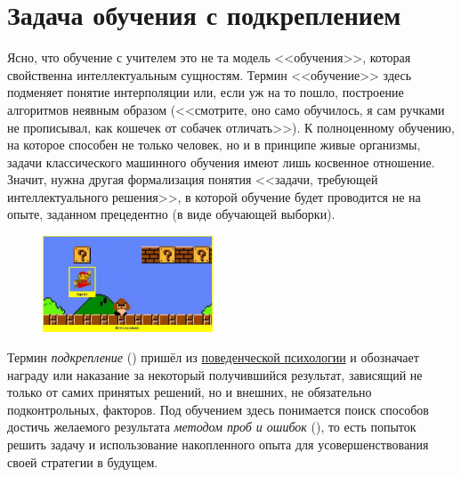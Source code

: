 \chapter{Задача обучения с подкреплением}

Ясно, что обучение с учителем это не та модель <<обучения>>, которая свойственна интеллектуальным сущностям. Термин <<обучение>> здесь подменяет понятие интерполяции или, если уж на то пошло, построение алгоритмов неявным образом (<<смотрите, оно само обучилось, я сам ручками не прописывал, как кошечек от собачек отличать>>). К полноценному обучению, на которое способен не только человек, но и в принципе живые организмы, задачи классического машинного обучения имеют лишь косвенное отношение. Значит, нужна другая формализация понятия <<задачи, требующей интеллектуального решения>>, в которой обучение будет проводится не на опыте, заданном прецедентно (в виде обучающей выборки).

\begin{figure}
\centering
\includegraphics[width=0.45\textwidth]{Images/agentenv.jpeg}
\end{figure}

Термин \emph{подкрепление} () пришёл из \href{https://ru.wikipedia.org/wiki/Бихевиоризм}{поведенческой психологии} и обозначает награду или наказание за некоторый получившийся результат, зависящий не только от самих принятых решений, но и внешних, не обязательно подконтрольных, факторов. Под обучением здесь понимается поиск способов достичь желаемого результата \emph{методом проб и ошибок} (), то есть попыток решить задачу и использование накопленного опыта для усовершенствования своей стратегии в будущем.

